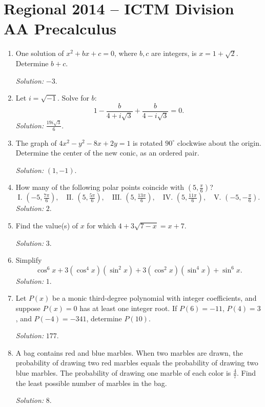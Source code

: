 \documentclass[11pt]{article}
\begin{document}
\section*{Regional 2014 -- ICTM Division AA Precalculus}
\begin{enumerate}[label=\textbf{\arabic*.}]
\item One solution of $x^2+bx+c=0$, where $b,c$ are integers, is $x=1+\sqrt2$. Determine $b+c$.\par\textit{Solution: }$-3$.

\item Let $i=\sqrt{-1}$. Solve for $b$:
\[
1-\frac{b}{4+i\sqrt3}+\frac{b}{4-i\sqrt3}=0.
\]
\textit{Solution: }$\frac{19i\sqrt3}{6}$.

\item The graph of $4x^2-y^2-8x+2y=1$ is rotated $90^\circ$ clockwise about the origin. Determine the center of the new conic, as an ordered pair.\par\textit{Solution: }$(1,-1)$.

\item How many of the following polar points coincide with $(5,\frac{\pi}{6})$?
\[
\text{I. }(-5,\tfrac{7\pi}{6}),\quad\text{II. }(5,\tfrac{5\pi}{6}),\quad\text{III. }(5,\tfrac{13\pi}{6}),\quad\text{IV. }(5,\tfrac{11\pi}{6}),\quad\text{V. }(-5,-\tfrac{\pi}{6}).
\]
\textit{Solution: }$2$.

\item Find the value(s) of $x$ for which $4+3\sqrt{7-x}=x+7$.\par\textit{Solution: }$3$.

\item Simplify
\[
\cos^6x+3(\cos^4x)(\sin^2x)+3(\cos^2x)(\sin^4x)+\sin^6x.
\]
\textit{Solution: }$1$.

\item Let $P(x)$ be a monic third-degree polynomial with integer coefficients, and suppose $P(x)=0$ has at least one integer root. If $P(6)=-11$, $P(4)=3$, and $P(-4)=-341$, determine $P(10)$.\par\textit{Solution: }$177$.

\item A bag contains red and blue marbles. When two marbles are drawn, the probability of drawing two red marbles equals the probability of drawing two blue marbles. The probability of drawing one marble of each color is $\frac47$. Find the least possible number of marbles in the bag.\par\textit{Solution: }$8$.


\end{enumerate}
\end{document}
